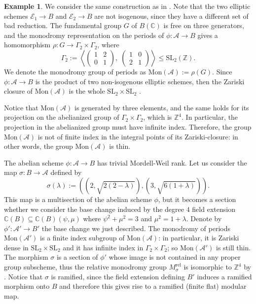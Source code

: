 \documentclass[10 pt,a4paper]{article}
\theoremstyle{plain}
\theoremstyle{definition}
\newtheorem{expl}[thm]{Example}
\theoremstyle{named}
\newcommand{\cA}{\mathcal A}
\newcommand{\bC}{\mathbb C}
\newcommand{\cE}{\mathcal E}
\newcommand{\bZ}{\mathbb Z}
\begin{document}
\begin{expl}\label{exa:thinMon}
    We consider the same construction as in . Note that the two elliptic schemes $\cE_1\to B$ and $\cE_2 \to B$ are not isogenous, since they have a diﬀerent set of bad reduction. The fundamental group $G$ of $B(\mathbb C)$ is free on three generators, and the monodromy representation on the periods of $\phi: \cA \to B$ gives a homomorphism $\rho:G \to \Gamma_2 \times \Gamma_2$, where
    \[
    \Gamma_2:=\left\langle
    \begin{pmatrix}
        1 & 2\\
        0 & 1
    \end{pmatrix},
    \;
    \begin{pmatrix}
        1 & 0\\
        2 & 1
    \end{pmatrix}
    \right\rangle \le \textrm{SL}_2(\mathbb Z).
    \]
    We denote the monodromy group of periods as $\textrm{Mon}(\cA):=\rho(G)$. Since $\phi:\cA \to B$ is the product of two non-isogenous elliptic schemes, then the Zariski closure of $\textrm{Mon}(\cA)$ is the whole $\textrm{SL}_2\times \textrm{SL}_2$ \cite[Theorem 5.3.10]{PONCELET}.

    Notice that $\textrm{Mon}(\cA)$ is generated by three elements, and the same holds for its projection on the abelianized group of $\Gamma_2 \times \Gamma_2$, which is $\mathbb Z^4$. In particular, the projection in the abelianized group must have infinite index. Therefore, the group $\textrm{Mon}(\cA)$ is not of finite index in the integral points of its Zariski-closure: in other words, the group $\textrm{Mon}(\cA)$ is thin.

    The abelian scheme $\phi\colon\cA\to B$ has trivial Mordell-Weil rank. Let us consider the map $\sigma:B \to \cA$ defined by
    \[
    \sigma(\lambda):=\left(\left(2,\sqrt{2(2-\lambda)}\right), \left(3, \sqrt{6(1+\lambda)}\right)\right).
    \]
    This map is a multisection of the abelian scheme $\phi$, but it becomes a section whether we consider the base change induced by the degree $4$ field extension $\bC(B) \subseteq \bC(B)(\psi,\mu)$ where $\psi^2 + \mu^2 = 3$ and $\mu^2=1+\lambda$. Denote by $\phi': \cA' \to B'$ the base change we just described. The monodromy of periods $\textrm{Mon}(\cA')$ is a finite index subgroup of $\textrm{Mon}(\cA)$: in particular, it is Zariski dense in $\textrm{SL}_2\times \textrm{SL}_2$ and it has infinite index in $\Gamma_2 \times \Gamma_2$; so $\textrm{Mon}(\cA')$ is still thin. The morphism $\sigma$ is a section of $\phi'$ whose image is not contained in any proper group subscheme, thus the relative monodromy group $M_\sigma^\textrm{rel}$ is isomorphic to $\bZ^4$ by \cite[Theorem 4.11]{T1}. Notice that $\sigma$ is ramified, since the field extension defining $B'$ induces a ramified morphism onto $B$ and therefore this gives rise to a ramified (finite flat) modular map.


\end{expl}
\end{document}
